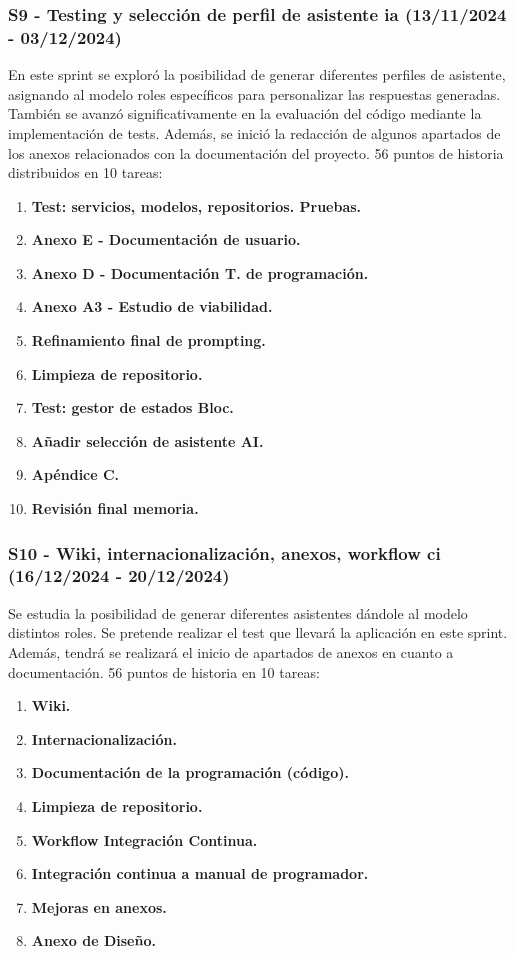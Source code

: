 \subsubsection{S9 - Testing y selección de perfil de asistente \acrshort{ia} (13/11/2024 - 03/12/2024)}
En este sprint se exploró la posibilidad de generar diferentes perfiles de asistente, asignando al modelo roles específicos para personalizar las respuestas generadas. También se avanzó significativamente en la evaluación del código mediante la implementación de tests. Además, se inició la redacción de algunos apartados de los anexos relacionados con la documentación del proyecto. 56 puntos de historia distribuidos en 10 tareas:
\begin{enumerate}
	\item \textbf{Test: servicios, modelos, repositorios. Pruebas.}
	\item \textbf{Anexo E - Documentación de usuario.}
	\item \textbf{Anexo D - Documentación T. de programación.}
	\item \textbf{Anexo A3 - Estudio de viabilidad.}
	\item \textbf{Refinamiento final de prompting.}
	\item \textbf{Limpieza de repositorio.}
	\item \textbf{Test: gestor de estados Bloc.}
	\item \textbf{Añadir selección de asistente AI.}
	\item \textbf{Apéndice C.}
	\item \textbf{Revisión final memoria.}
\end{enumerate}

\subsubsection{S10 - Wiki, internacionalización, anexos, workflow ci (16/12/2024 - 20/12/2024)}
Se estudia la posibilidad de generar diferentes asistentes dándole al modelo distintos roles. Se pretende realizar el test que llevará la aplicación en este sprint. Además, tendrá se realizará el inicio de apartados de anexos en cuanto a documentación. 56 puntos de historia en 10 tareas:%
\begin{enumerate}
	\item \textbf{Wiki.}
	\item \textbf{Internacionalización.}
	\item \textbf{Documentación de la programación (código).}
	\item \textbf{Limpieza de repositorio.}
	\item \textbf{Workflow Integración Continua.}
	\item \textbf{Integración continua a manual de programador.}
	\item \textbf{Mejoras en anexos.}
	\item \textbf{Anexo de Diseño.}
\end{enumerate}


